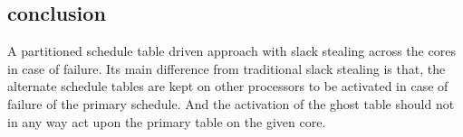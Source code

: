 \subsection*{conclusion}
A partitioned schedule table driven approach with slack stealing across the cores in case of failure. Its main difference from traditional slack stealing is that, the alternate schedule tables are kept on other processors to be activated in case of failure of the primary schedule. And the activation of the ghost table should not in any way act upon the primary table on the given core.